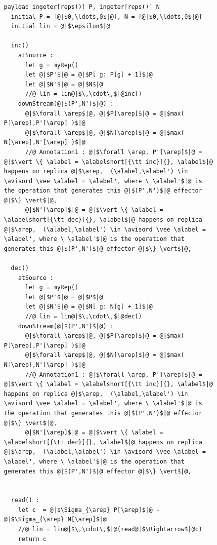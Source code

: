 \begin{figure}[t]
\begin{lstlisting}[frame=top,caption={Pseudo-code of operation-based PN-counter},
captionpos=b,label={lst:operation-based PN-counter}]
  payload ingeter[reps()] P, ingeter[reps()] N
  initial P = [@|$0,\ldots,0$|@], N = [@|$0,\ldots,0$|@]
  initial lin = @|$\epsilon$|@

  inc()
    atSource :
      let g = myRep()
      let @|$P'$|@ = @|$P[ g: P[g] + 1]$|@
      let @|$N'$|@ = @|$N$|@
      //@ lin = lin@|$\,\cdot\,$|@inc()
    downStream(@|$(P',N')$|@) :
      @|$\forall \arep$|@, @|$P[\arep]$|@ = @|$max( P[\arep],P'[\arep] )$|@
      @|$\forall \arep$|@, @|$N[\arep]$|@ = @|$max( N[\arep],N'[\arep] )$|@
      //@ Annotation1 : @|$\forall \arep, P'[\arep]$|@ = @|$\vert \{ \alabel = \alabelshort[{\tt inc}]{}, \alabel$|@ happens on replica @|$\arep,  (\alabel,\alabel') \in \avisord \vee \alabel = \alabel', where \ \alabel'$|@ is the operation that generates this @|$(P',N')$|@ effector @|$\} \vert$|@,
      @|$N'[\arep]$|@ = @|$\vert \{ \alabel = \alabelshort[{\tt dec}]{}, \alabel$|@ happens on replica @|$\arep,  (\alabel,\alabel') \in \avisord \vee \alabel = \alabel', where \ \alabel'$|@ is the operation that generates this @|$(P',N')$|@ effector @|$\} \vert$|@,

  dec()
    atSource :
      let g = myRep()
      let @|$P'$|@ = @|$P$|@
      let @|$N'$|@ = @|$N[ g: N[g] + 1]$|@
      //@ lin = lin@|$\,\cdot\,$|@dec()
    downStream(@|$(P',N')$|@) :
      @|$\forall \arep$|@, @|$P[\arep]$|@ = @|$max( P[\arep],P'[\arep] )$|@
      @|$\forall \arep$|@, @|$N[\arep]$|@ = @|$max( N[\arep],N'[\arep] )$|@
      //@ Annotation1 : @|$\forall \arep, P'[\arep]$|@ = @|$\vert \{ \alabel = \alabelshort[{\tt inc}]{}, \alabel$|@ happens on replica @|$\arep,  (\alabel,\alabel') \in \avisord \vee \alabel = \alabel', where \ \alabel'$|@ is the operation that generates this @|$(P',N')$|@ effector @|$\} \vert$|@,
      @|$N'[\arep]$|@ = @|$\vert \{ \alabel = \alabelshort[{\tt dec}]{}, \alabel$|@ happens on replica @|$\arep,  (\alabel,\alabel') \in \avisord \vee \alabel = \alabel', where \ \alabel'$|@ is the operation that generates this @|$(P',N')$|@ effector @|$\} \vert$|@,


  read() :
    let c  = @|$\Sigma_{\arep} P[\arep]$|@ - @|$\Sigma_{\arep} N[\arep]$|@
    //@ lin = lin@|$\,\cdot\,$|@(read@|$\Rightarrow$|@c)
    return c
\end{lstlisting}
\end{figure}







